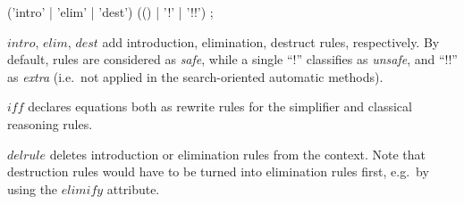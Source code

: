 \begin{rail}
  ('intro' | 'elim' | 'dest') (() | '!' | '!!')
  ;
\end{rail}

\begin{descr}
\item [$intro$, $elim$, $dest$] add introduction, elimination, destruct rules,
  respectively.  By default, rules are considered as \emph{safe}, while a
  single ``!'' classifies as \emph{unsafe}, and ``!!'' as \emph{extra} (i.e.\ 
  not applied in the search-oriented automatic methods).
  
\item [$iff$] declares equations both as rewrite rules for the simplifier and
  classical reasoning rules.

\item [$delrule$] deletes introduction or elimination rules from the context.
  Note that destruction rules would have to be turned into elimination rules
  first, e.g.\ by using the $elimify$ attribute.
\end{descr}


